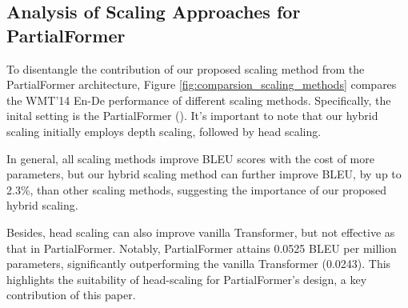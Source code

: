\documentclass[11pt]{article}
\begin{document}
\subsection{Analysis of Scaling Approaches for PartialFormer}
\label{sec:analysis_scaling_strategy_partialformer}


To disentangle the contribution of our proposed scaling
method from the PartialFormer architecture, Figure \ref{fig:comparsion_scaling_methods} compares the WMT'14 En-De performance of different scaling methods. Specifically, the inital setting is the PartialFormer (). It's important to note that our hybrid scaling initially employs depth scaling, followed by head scaling.  

 In general, all scaling methods improve BLEU scores with the cost
of more parameters, but our hybrid scaling method can
further improve BLEU, by up to 2.3\%, than other scaling methods, suggesting the importance of
our proposed hybrid scaling.

Besides, head scaling can also improve vanilla Transformer, but not effective as that in PartialFormer. Notably, PartialFormer attains 0.0525 BLEU per million parameters, significantly outperforming the vanilla Transformer (0.0243). This highlights the suitability of head-scaling for PartialFormer's design, a key contribution of this paper.




\begin{table}[t!]
    \centering
    \renewcommand{\arraystretch}{1}
\centering
\small
\setlength{\tabcolsep}{1.5pt}
    \caption{Rough-1, Rough-2 and Rough-L comparisons on CNN-DailyMail task. }
    \label{tab:result_as}
\end{table}
\end{document}
